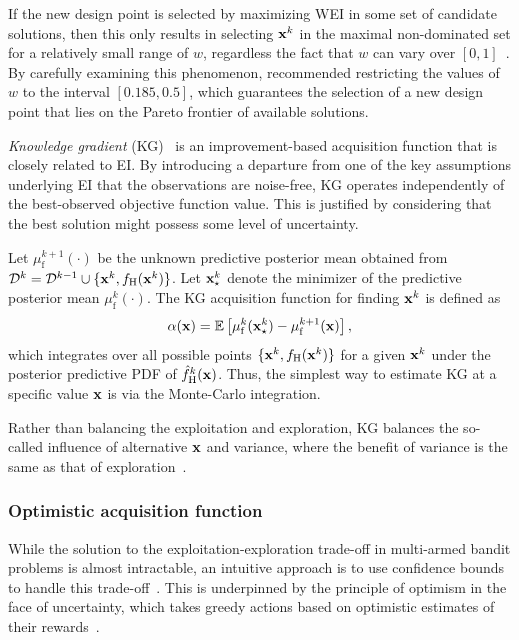 \documentclass[iicol,sn-basic]{sn-jnl}%
\begin{document}
If the new design point is selected by maximizing WEI in some set of candidate solutions, then this only results in selecting ${\bf x}^k$ in the maximal non-dominated set for a relatively small range of $w$, regardless the fact that $w$ can vary over $[0,1]$~\citep{Ath2021}.
By carefully examining this phenomenon, \cite{Ath2021} recommended restricting the values of $w$ to the interval $[0.185,0.5]$, which guarantees the selection of a new design point that lies on the Pareto frontier of available solutions.

\textit{Knowledge gradient} (KG)~\citep{Frazier2008} is an improvement-based acquisition function that is closely related to EI.
By introducing a departure from one of the key assumptions underlying EI that the observations are noise-free, KG operates independently of the best-observed objective function value.
This is justified by considering that the best solution might possess some level of uncertainty.

Let $\mu_\text{f}^{k+1}({\cdot})$ be the unknown predictive posterior mean obtained from $\mathcal{D}^{k} = \mathcal{D}^{k-1} \cup \{{\bf x}^{k},f_\text{H}({\bf x}^{k})\}$.
Let ${\bf x}_{\star}^k$ denote the minimizer of the predictive posterior mean $\mu_\text{f}^k({\cdot})$.
The KG acquisition function for finding ${\bf x}^k$ is defined as~\citep{Frazier2008}
\begin{equation}\label{eqn41}
	\alpha({\bf x}) = \mathbb{E}\left[\mu_\text{f}^k({\bf x}_{\star}^k)-\mu_\text{f}^{k+1}({\bf x})\right],
\end{equation}
which integrates over all possible points $\{{\bf x}^k,f_\text{H}({\bf x}^k)\}$ for a given ${\bf x}^k$ under the posterior predictive PDF of $\hat{f}_\text{H}^k({\bf x})$.
Thus, the simplest way to estimate KG at a specific value ${\bf x}$ is via the Monte-Carlo integration.

Rather than balancing the exploitation and exploration, KG balances the so-called influence of alternative ${\bf x}$ and variance, where the benefit of variance is the same as that of exploration~\citep{Frazier2008}.

\subsubsection{Optimistic acquisition function}\label{Sec512}

While the solution to the exploitation-exploration trade-off in multi-armed bandit problems is almost intractable, an intuitive approach is to use confidence bounds to handle this trade-off~\citep{Lai1985,Auer2002}.
This is underpinned by the principle of optimism in the face of uncertainty,
which takes greedy actions based on optimistic estimates of their rewards~\citep{Shahriari2016}.
\end{document}
